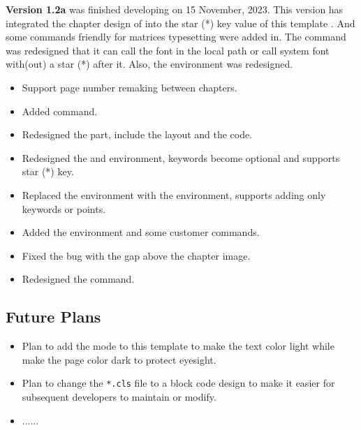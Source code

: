 \textsf{\bfseries Version 1.2a} was finished developing on 15 November, 2023. This version has  integrated the chapter design of \href{https://www.ctan.org/pkg/elegantbook}{} into the star (*) key value of this template . And some commands friendly for matrices typesetting were added in. The command  was redesigned that it can call the font in the local path or call system font with(out) a star (*) after it. Also, the environment  was redesigned.

\begin{itemize}
    \item Support page number remaking between chapters.
    \item Added  command.
\end{itemize}

\begin{itemize}
    \item Redesigned the  part, include the layout and the code.
    \item Redesigned the  and  environment, keywords become optional and supports star (*) key. 
    \item Replaced the  environment with the  environment, supports adding only keywords or points.
    \item Added the  environment and some customer commands.
\end{itemize}

\begin{itemize}
    \item Fixed the bug with the gap above the chapter image.
    \item Redesigned the  command.
\end{itemize}

\subsection*{Future Plans}
\begin{itemize}
    \item Plan to add the  mode to this template to make the text color light while make the page color dark to protect eyesight.
    \item Plan to change the \verb|*.cls| file to a block code design to make it easier for subsequent developers to maintain or modify.
    \item ......
\end{itemize}